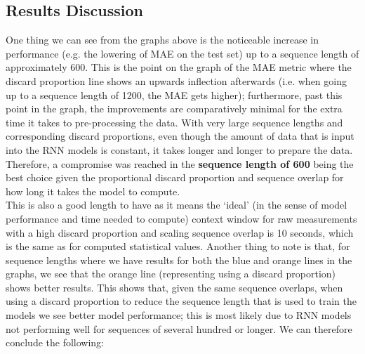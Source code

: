 \documentclass[12pt,twoside]{report}
\begin{document}
\subsection{Results Discussion}

\quad One thing we can see from the graphs above is the noticeable increase in performance (e.g. the lowering of MAE on the test set) up to a sequence length of approximately 600. This is the point on the graph of the MAE metric where the discard proportion line shows an upwards inflection afterwards (i.e. when going up to a sequence length of 1200, the MAE gets higher); furthermore, past this point in the graph, the improvements are comparatively minimal for the extra time it takes to pre-processing the data. With very large sequence lengths and corresponding discard proportions, even though the amount of data that is input into the RNN models is constant, it takes longer and longer to prepare the data. Therefore, a compromise was reached in the \textbf{sequence length of 600} being the best choice given the proportional discard proportion and sequence overlap for how long it takes the model to compute.\\

\quad This is also a good length to have as it means the ‘ideal’ (in the sense of model performance and time needed to compute) context window for raw measurements with a high discard proportion and scaling sequence overlap is 10 seconds, which is the same as for computed statistical values. Another thing to note is that, for sequence lengths where we have results for both the blue and orange lines in the graphs, we see that the orange line (representing using a discard proportion) shows better results. This shows that, given the same sequence overlaps, when using a discard proportion to reduce the sequence length that is used to train the models we see better model performance; this is most likely due to RNN models not performing well for sequences of several hundred or longer. We can therefore conclude the following:
\end{document}
